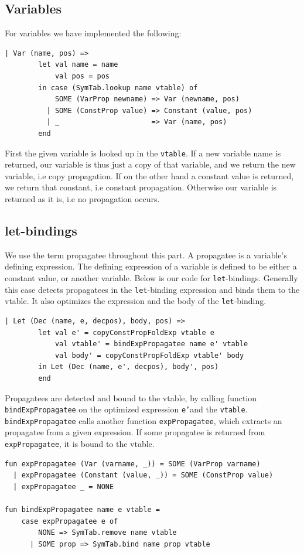 \documentclass[11pt]{article}
\begin{document}
	\subsection{Variables}
	For variables we have implemented the following:
	\begin{lstlisting}[basicstyle=\small]
      | Var (name, pos) =>
        let val name = name
            val pos = pos
        in case (SymTab.lookup name vtable) of
            SOME (VarProp newname) => Var (newname, pos)
          | SOME (ConstProp value) => Constant (value, pos)
          | _                      => Var (name, pos)
        end
	\end{lstlisting}
	First the given variable is looked up in the \texttt{vtable}. If a new variable name is returned, our
	variable is thus just a copy of that variable, and we return the new variable, i.e copy propagation. If
	on the other hand a constant value is returned, we return that constant, i.e constant propagation.
	Otherwise our variable is returned as it is, i.e no propagation occurs.
	\subsection{let-bindings}
	We use the term propagatee throughout this part. A propagatee is a variable's defining expression. The
	defining expression of a variable is defined to be either a constant value, or another variable. Below is
	our code for \texttt{let}-bindings. Generally this case detects propagatees in the
	\texttt{let}-binding expression and binds them to the vtable. It also optimizes the expression and the
	body of the \texttt{let}-binding.
	\begin{lstlisting}[basicstyle=\small]
      | Let (Dec (name, e, decpos), body, pos) =>
        let val e' = copyConstPropFoldExp vtable e
            val vtable' = bindExpPropagatee name e' vtable
            val body' = copyConstPropFoldExp vtable' body
        in Let (Dec (name, e', decpos), body', pos)
        end
	\end{lstlisting}
	Propagatees are detected and bound to the vtable, by calling function \texttt{bindExpPropagatee} on the optimized expression
	\texttt{e'}and the \texttt{vtable}. \texttt{bindExpPropagatee} calls another function \texttt{expPropagatee}, which extracts
	an propagatee from a given expression. If some propagatee is returned from \texttt{expPropagatee}, it is bound to the vtable.
	\begin{lstlisting}[basicstyle=\small]
fun expPropagatee (Var (varname, _)) = SOME (VarProp varname)
  | expPropagatee (Constant (value, _)) = SOME (ConstProp value)
  | expPropagatee _ = NONE

fun bindExpPropagatee name e vtable =
    case expPropagatee e of
        NONE => SymTab.remove name vtable
      | SOME prop => SymTab.bind name prop vtable
	\end{lstlisting}
\end{document}
